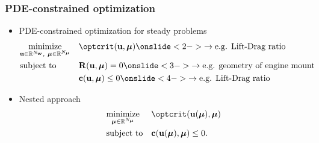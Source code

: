 \def\PstructdispBYabsvarI{\pdfrac{\structdisp} {\absvar_i}}
\def\PmmsBYabsvarI       {\pdfrac{\mms}        {\absvar_i}}
\def\PfstateBYabsvarI    {\pdfrac{\fstate}     {\absvar_i}}

\begin{frame}
  \frametitle{PDE-constrained optimization}

  \begin{itemize}
    \item PDE-constrained optimization for steady problems
      \begin{equation*}
        \begin{aligned}
          & \underset{\ubold \in \Rbb^{N_\wbold},~\mubold \in \Rbb^{N_\mubold}}{\text{minimize}}
          & & \optcrit(\ubold, \mubold)\onslide<2->{\rightarrow \text{e.g. Lift-Drag ratio}} \\
          & \text{subject to}
          & & \Rbold(\ubold, \mubold) = 0 \onslide<3->{\rightarrow \text{e.g. geometry of engine mount}} \\
          & & & \cbold(\ubold, \mubold) \leq 0 \onslide<4->{\rightarrow \text{e.g. Lift-Drag ratio}}
        \end{aligned}
      \end{equation*}
    \item Nested approach
      \begin{equation*}
        \begin{aligned}
          & \underset{\mubold \in \Rbb^{N_\mubold}}{\text{minimize}}
          & & \optcrit(\ubold(\mubold), \mubold) \\
          & \text{subject to}
          & & \cbold(\ubold(\mubold), \mubold) \leq 0.
        \end{aligned}
      \end{equation*}
  \end{itemize}
\end{frame}


